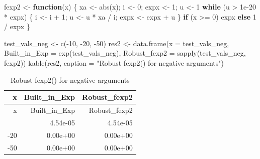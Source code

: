 \documentclass[
  letterpaper,
  DIV=11,
  numbers=noendperiod]{scrreprt}
\newenvironment{Shaded}{\begin{snugshade}}{\end{snugshade}}
\newcommand{\AttributeTok}[1]{\textcolor[rgb]{0.40,0.45,0.13}{#1}}
\newcommand{\ControlFlowTok}[1]{\textcolor[rgb]{0.00,0.23,0.31}{\textbf{#1}}}
\newcommand{\DecValTok}[1]{\textcolor[rgb]{0.68,0.00,0.00}{#1}}
\newcommand{\FloatTok}[1]{\textcolor[rgb]{0.68,0.00,0.00}{#1}}
\newcommand{\FunctionTok}[1]{\textcolor[rgb]{0.28,0.35,0.67}{#1}}
\newcommand{\NormalTok}[1]{\textcolor[rgb]{0.00,0.23,0.31}{#1}}
\newcommand{\OtherTok}[1]{\textcolor[rgb]{0.00,0.23,0.31}{#1}}
\newcommand{\SpecialCharTok}[1]{\textcolor[rgb]{0.37,0.37,0.37}{#1}}
\newcommand{\StringTok}[1]{\textcolor[rgb]{0.13,0.47,0.30}{#1}}
\begin{document}
\begin{Shaded}
\begin{Highlighting}[]
\NormalTok{fexp2 }\OtherTok{\textless{}{-}} \ControlFlowTok{function}\NormalTok{(x) \{}
\NormalTok{  xa }\OtherTok{\textless{}{-}} \FunctionTok{abs}\NormalTok{(x); i }\OtherTok{\textless{}{-}} \DecValTok{0}\NormalTok{; expx }\OtherTok{\textless{}{-}} \DecValTok{1}\NormalTok{; u }\OtherTok{\textless{}{-}} \DecValTok{1}
  \ControlFlowTok{while}\NormalTok{ (u }\SpecialCharTok{\textgreater{}} \FloatTok{1e{-}20} \SpecialCharTok{*}\NormalTok{ expx) \{ i }\OtherTok{\textless{}{-}}\NormalTok{ i }\SpecialCharTok{+} \DecValTok{1}\NormalTok{; u }\OtherTok{\textless{}{-}}\NormalTok{ u }\SpecialCharTok{*}\NormalTok{ xa }\SpecialCharTok{/}\NormalTok{ i; expx }\OtherTok{\textless{}{-}}\NormalTok{ expx }\SpecialCharTok{+}\NormalTok{ u \}}
  \ControlFlowTok{if}\NormalTok{ (x }\SpecialCharTok{\textgreater{}=} \DecValTok{0}\NormalTok{) expx }\ControlFlowTok{else} \DecValTok{1} \SpecialCharTok{/}\NormalTok{ expx}
\NormalTok{\}}

\NormalTok{test\_vals\_neg }\OtherTok{\textless{}{-}} \FunctionTok{c}\NormalTok{(}\SpecialCharTok{{-}}\DecValTok{10}\NormalTok{, }\SpecialCharTok{{-}}\DecValTok{20}\NormalTok{, }\SpecialCharTok{{-}}\DecValTok{50}\NormalTok{)}
\NormalTok{res2 }\OtherTok{\textless{}{-}} \FunctionTok{data.frame}\NormalTok{(}\AttributeTok{x =}\NormalTok{ test\_vals\_neg, }\AttributeTok{Built\_in\_Exp =} \FunctionTok{exp}\NormalTok{(test\_vals\_neg), }\AttributeTok{Robust\_fexp2 =} \FunctionTok{sapply}\NormalTok{(test\_vals\_neg, fexp2))}
\FunctionTok{kable}\NormalTok{(res2, }\AttributeTok{caption =} \StringTok{"Robust fexp2() for negative arguments"}\NormalTok{)}
\end{Highlighting}
\end{Shaded}

\begin{longtable}[]{@{}rrr@{}}
\caption{Robust fexp2() for negative arguments}\tabularnewline
\toprule\noalign{}
x & Built\_in\_Exp & Robust\_fexp2 \\
\midrule\noalign{}
\endfirsthead
\toprule\noalign{}
x & Built\_in\_Exp & Robust\_fexp2 \\
\midrule\noalign{}
\endhead
\bottomrule\noalign{}
\endlastfoot
-10 & 4.54e-05 & 4.54e-05 \\
-20 & 0.00e+00 & 0.00e+00 \\
-50 & 0.00e+00 & 0.00e+00 \\
\end{longtable}
\end{document}
